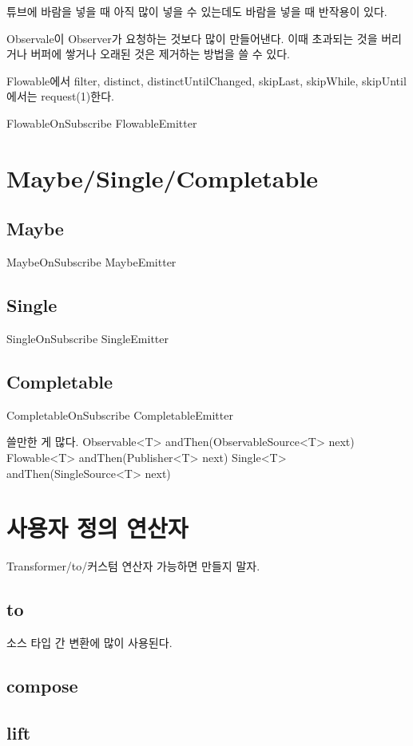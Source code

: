 \documentclass{book}
\begin{document}
{튜브에 바람을 넣을 때 아직 많이 넣을 수 있는데도 바람을 넣을 때 반작용이 있다.

Observale이 Observer가 요청하는 것보다 많이 만들어낸다.
이때 초과되는 것을 버리거나 버퍼에 쌓거나 오래된 것은 제거하는 방법을 쓸 수 있다.

Flowable에서 filter, distinct, distinctUntilChanged, skipLast, skipWhile, skipUntil 에서는 request(1)한다.

FlowableOnSubscribe
FlowableEmitter

\chapter{Maybe/Single/Completable}

\section{Maybe}
MaybeOnSubscribe
MaybeEmitter
\section{Single}
SingleOnSubscribe
SingleEmitter

\section{Completable}
CompletableOnSubscribe
CompletableEmitter

쓸만한 게 많다.
Observable<T> andThen(ObservableSource<T> next)
Flowable<T> andThen(Publisher<T> next)
Single<T> andThen(SingleSource<T> next)
 

\chapter{사용자 정의 연산자}
Transformer/to/커스텀 연산자
가능하면 만들지 말자.

\section{to}
소스 타입 간 변환에 많이 사용된다.

\section{compose}


\section{lift}

}
\end{document}
